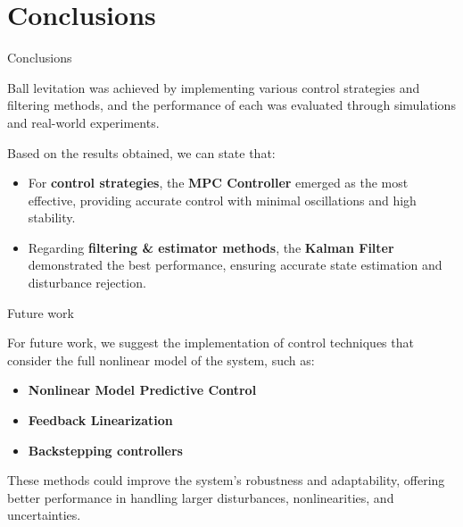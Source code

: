 \section{Conclusions}

\begin{frame}{Conclusions}

    Ball levitation was achieved by implementing various control strategies and filtering methods, and the performance of each was evaluated through simulations and real-world experiments.

    \vspace{9pt}

    Based on the results obtained, we can state that:

    \begin{itemize}
        \item For \textbf{control strategies}, the \textbf{MPC Controller} emerged as the most effective, providing accurate control with minimal oscillations and high stability.
        \item Regarding \textbf{filtering \& estimator methods}, the \textbf{Kalman Filter} demonstrated the best performance, ensuring accurate state estimation and disturbance rejection.
    \end{itemize}

\end{frame}



\begin{frame}{Future work}

    For future work, we suggest the implementation of control techniques that consider the full nonlinear model of the system, such as:

    \begin{itemize}
        \item \textbf{Nonlinear Model Predictive Control}
        \item \textbf{Feedback Linearization}
        \item \textbf{Backstepping controllers}
    \end{itemize}

    These methods could improve the system's robustness and adaptability, offering better performance in handling larger disturbances, nonlinearities, and uncertainties.

\end{frame}
